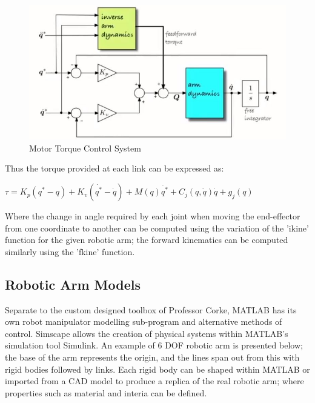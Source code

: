 \documentclass[12pt,openany,a4paper]{book}
\begin{document}
\begin{center}
\begin{figure}[htb]
  \includegraphics[width=\linewidth]{Correcting_for_disturbance_torque.jpg}
\caption{Motor Torque Control System}
\end{figure}
\end{center}

Thus the torque provided at each link can be expressed as:

$\tau = K_p (q^{*} - q) + K_v (\dot{q^{*}} - \dot{q}) + M(q) \ddot{q^{*}} + C_j (q, \dot{q}) \dot{q} + g_j (q)$

Where the change in angle required by each joint when moving the end-effector from one coordinate to another can be computed using the variation of the 'ikine' function for the given robotic arm; the forward kinematics can be computed similarly using the 'fkine' function.

\subsection{Robotic Arm Models}
Separate to the custom designed toolbox of Professor Corke, MATLAB has its own robot manipulator modelling sub-program and alternative methods of control. Simscape allows the creation of physical systems within MATLAB's simulation tool Simulink. An example of 6 DOF robotic arm is presented below; the base of the arm represents the origin, and the lines span out from this with rigid bodies followed by links. Each rigid body can be shaped within MATLAB or imported from a CAD model to produce a replica of the real robotic arm; where properties such as material and interia can be defined.
\end{document}
